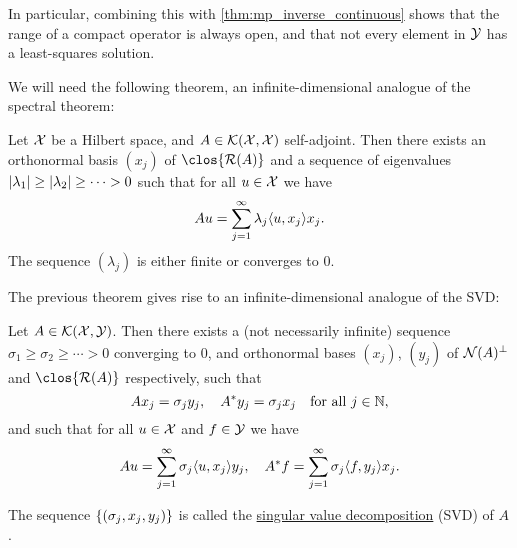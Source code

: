 In particular, combining this with \cref{thm:mp_inverse_continuous} shows that the range of a compact operator is always open, and that not every element in $\mathcal Y$ has a least-squares solution. 

We will need the following theorem, an infinite-dimensional analogue of the spectral theorem: 
\begin{theorem} Let $\mathcal X$ be a Hilbert space, and $A \in \mathcal K(\mathcal X, \mathcal X)$ self-adjoint. Then there exists an orthonormal basis $(x_j)$ of $
   \clos{\Ran(A)}$ and a sequence of eigenvalues $\abs{\lambda_1} \geq \abs{\lambda_2} \geq \dotsb > 0$ such that for all $u \in \mathcal X$ we have
    \[
    Au = \sum_{j=1}^\infty \lambda_j \langle u, x_j\rangle x_j. 
    \]
The sequence $(\lambda_j)$ is either finite or converges to 0. 
\end{theorem}

The previous theorem gives rise to an infinite-dimensional analogue of the SVD:
\begin{theorem}
    Let $A \in \mathcal K(\mathcal X, \mathcal Y)$. Then there exists a (not necessarily infinite) sequence $\sigma_1 \geq \sigma_2 \geq \dotsb > 0$ converging to 0, and orthonormal bases $(x_j)$, $(y_j)$ of $\operatorname{\mathcal N}(A)^\perp$ and $\clos{\Ran(A)}$ respectively, such that
    \[
    Ax_j = \sigma_j y_j, \quad A^* y_j = \sigma_j x_j \quad\text{for all $j \in \mathbb N$}, 
    \]
    and such that for all $u \in \mathcal X$ and $f \in \mathcal Y$ we have
    \[
    Au = \sum_{j=1}^\infty \sigma_j \langle u, x_j\rangle y_j, \quad A^* f = \sum_{j=1}^\infty \sigma_j \langle f, y_j\rangle x_j.
    \]
    
    The sequence $\qty{(\sigma_j, x_j, y_j)}$ is called the \uline{singular value decomposition} (SVD) of $A$.
\end{theorem}

